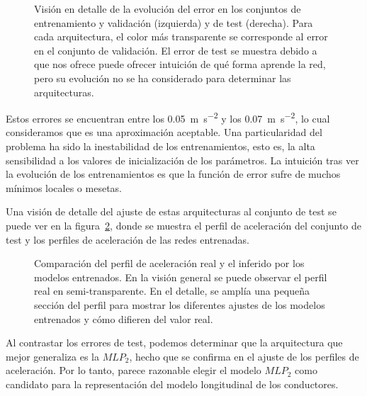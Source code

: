 \begin{figure}
	\centering
	\qquad
	\caption[Evolución del error durante el entrenamiento en las arquitecturas de \acrshort{mlp} para el modelo longitudinal]{Visión en detalle de la evolución del error en los conjuntos de entrenamiento y validación (izquierda) y de test (derecha). Para cada arquitectura, el color más transparente se corresponde al error en el conjunto de validación. El error de test se muestra debido a que nos ofrece puede ofrecer intuición de qué forma aprende la red, pero su evolución no se ha considerado para determinar las arquitecturas.}
	\label{fig:lm-mlp-rmse-all-comparisons}
\end{figure}

Estos errores se encuentran entre los \SI{0.05}{\metre\per\square\second} y los \SI{0.07}{\metre\per\square\second}, lo cual consideramos que es una aproximación aceptable. Una particularidad del problema ha sido la inestabilidad de los entrenamientos, esto es, la alta sensibilidad a los valores de inicialización de los parámetros. La intuición tras ver la evolución de los entrenamientos es que la función de error sufre de muchos mínimos locales o mesetas.

Una visión de detalle del ajuste de estas arquitecturas al conjunto de test se puede ver en la figura~\ref{fig:cf-mlp-test-comparisons}, donde se muestra el perfil de aceleración del conjunto de test y los perfiles de aceleración de las redes entrenadas.

\begin{figure}
	\centering
	\qquad
	\caption[Comparación del perfil de aceleración real y el inferido por los modelos entrenados]{Comparación del perfil de aceleración real y el inferido por los modelos entrenados. En la visión general se puede observar el perfil real en semi-transparente. En el detalle, se amplía una pequeña sección del perfil para mostrar los diferentes ajustes de los modelos entrenados y cómo difieren del valor real.}
	\label{fig:cf-mlp-test-comparisons}
\end{figure}

Al contrastar los errores de test, podemos determinar que la arquitectura que mejor generaliza es la $MLP_2$, hecho que se confirma en el ajuste de los perfiles de aceleración. Por lo tanto, parece razonable elegir el modelo $MLP_2$ como candidato para la representación del modelo longitudinal de los conductores.

